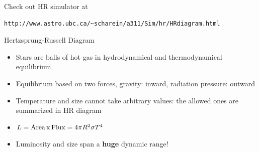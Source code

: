 \documentclass[letterpaper,landscape]{slides}
\begin{document}
\begin{slide}
{\begin{minipage}[t]{12cm}
\begin{center}
\vskip -1.1in
\vskip -0.4in
\end{center}
\vskip -0.5in
Check out HR simulator at
\begin{verbatim}
http://www.astro.ubc.ca/~scharein/a311/Sim/hr/HRdiagram.html
\end{verbatim}
\end{minipage}

\begin{minipage}[t]{12cm}
\begin{center}
\phantom{xxx}
\vskip -1in
{\large \color{red} Hertzsprung-Russell Diagram }
\end{center}


\begin{itemize}
\item {\color{blue} Stars are balls of hot gas} in hydrodynamical and thermodynamical equilibrium
\item {\color{blue} Equilibrium based on two forces}, gravity: inward, radiation pressure: outward
\item {\color{blue} Temperature and size} cannot take arbitrary values: the allowed ones are 
     summarized in HR diagram 
\item {\color{red} $L = {\rm Area} \, {\rm  x} \, {\rm  Flux} = 4\pi R^2 \sigma T^4$}
\item {\color{blue} Luminosity and size} span a {\bf huge} dynamic range!
\end{itemize}


\end{minipage}}
\end{slide}
\end{document}
